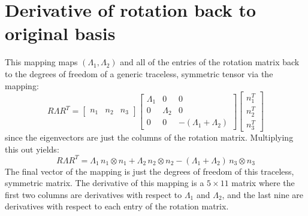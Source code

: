 \documentclass[reqno]{article}
\begin{document}
  \section{Derivative of rotation back to original basis}
  This mapping maps $(\Lambda_1, \Lambda_2)$ and all of the entries of the
  rotation matrix back to the degrees of freedom of a generic traceless,
  symmetric tensor via the mapping:
  \begin{equation}
    R \Lambda R^T
    =
    \begin{bmatrix}
      n_1 & n_2 & n_3
    \end{bmatrix}
    \begin{bmatrix}
      \Lambda_1 & 0 & 0 \\
      0 & \Lambda_2 & 0 \\
      0 & 0 & -(\Lambda_1 + \Lambda_2)
    \end{bmatrix}
    \begin{bmatrix}
      n_1^T \\
      n_2^T \\
      n_3^T
    \end{bmatrix}
  \end{equation}
  since the eigenvectors are just the columns of the rotation matrix.
  Multiplying this out yields:
  \begin{equation}
    R \Lambda R^T
    =
    \Lambda_1 \, n_1 \otimes n_1
    + \Lambda_2 \, n_2 \otimes n_2
    - (\Lambda_1 + \Lambda_2) \, n_3 \otimes n_3
  \end{equation}
  The final vector of the mapping is just the degrees of freedom of this
  traceless, symmetric matrix.
  The derivative of this mapping is a $5\times 11$ matrix where the first two
  columns are derivatives with respect to $\Lambda_1$ and $\Lambda_2$, and the
  last nine are derivatives with respect to each entry of the rotation matrix.
\end{document}
